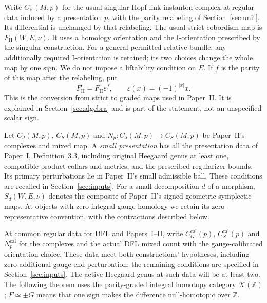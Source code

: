 \documentclass[11pt]{amsart}
\theoremstyle{definition}
\theoremstyle{remark}
\theoremstyle{plain}
\newcommand{\ZZ}{\mathbb Z}
\newcommand{\eps}{\varepsilon}
\newcommand{\calib}{\mathrm{cal}}
\newcommand{\CH}{C_{\mathrm H}}
\newcommand{\CJ}{C_J}
\newcommand{\CS}{C_S}
\newcommand{\FH}{F_{\mathrm H}}
\newcommand{\cK}{\mathcal K}
\begin{document}
Write $\CH(M,p)$ for the usual singular Hopf-link instanton complex
at regular data induced by a presentation $p$, with the parity
relabeling of Section~\ref{sec:unit}. Its differential is unchanged
by that relabeling. The usual strict cobordism map is $\FH(W,E,\nu)$.
It uses a homology orientation and the I-orientation prescribed by
the singular construction. For a general permitted relative bundle,
any additionally required I-orientation is retained; its two choices
change the whole map by one sign. We do not impose a liftability
condition on $E$. If $f$ is the parity of this map after the relabeling,
put
\[
 \FH^{\mathrm r}=\FH\eps^f,
 \qquad \eps(x)=(-1)^{|x|}x.
\]
This is the conversion from strict to graded maps used in Paper~II.
It is explained in Section~\ref{sec:algebra} and is part of the
statement, not an unspecified scalar sign.

Let $\CJ(M,p)$, $\CS(M,p)$ and
$N_p:\CJ(M,p)\to\CS(M,p)$ be Paper~II's complexes and mixed map.
A \emph{small presentation} has all the presentation data of
Paper~I, Definition~3.3, including original Heegaard genus at least
one, compatible product collars and metrics, and the prescribed
regularizer bounds. Its primary perturbations lie in Paper~II's
small admissible ball. These conditions are recalled in
Section~\ref{sec:inputs}. For a small decomposition
$d$ of a morphism, $S_d(W,E,\nu)$ denotes the composite of Paper~II's
signed geometric symplectic maps. At objects with zero integral gauge
homology we retain its zero-representative convention, with the
contractions described below.

At common regular data for DFL and Papers~I--II, write
$C_G^{\calib}(p)$, $C_S^{\calib}(p)$ and $N_p^{\calib}$ for the
complexes and the actual DFL mixed count with the gauge-calibrated
orientation choice. These data meet both constructions' hypotheses,
including zero additional gauge-end perturbation; the remaining
conditions are specified in Section~\ref{sec:inputs}.
The active Heegaard genus at such data will be
at least two. The following theorem uses the parity-graded integral
homotopy category $\cK(\ZZ)$; $F\simeq\pm G$ means that one sign
makes the difference null-homotopic over $\ZZ$.
\end{document}
